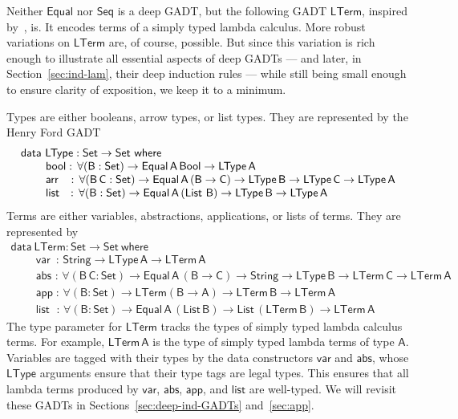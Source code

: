 \documentclass[9pt]{entcs}
\begin{document}
Neither $\mathsf{Equal}$ nor $\mathsf{Seq}$ is a deep GADT, but the
following GADT $\mathsf{LTerm}$, inspired by~\cite{cis194}, is.  It
encodes terms of a simply typed lambda calculus. More robust
variations on $\mathsf{LTerm}$ are, of course, possible. But since
this variation is rich enough to illustrate all essential aspects of
deep GADTs --- and later, in Section~\ref{sec:ind-lam}, their deep
induction rules --- while still being small enough to ensure clarity
of exposition, we keep it to a minimum.

Types are either booleans, arrow types, or list types. They are
represented by the Henry Ford GADT
\begin{equation}\label{eq:eq_ltype}
\begin{array}{l}
\mathsf{data\ LType : Set \to Set\ where}\\
\mathsf{\;\;\;\;\;\;\;\;bool :\, \forall (B : Set) \to Equal\,A\,Bool
  \to LType\,A}\\ 
\mathsf{\;\;\;\;\;\;\;\;arr\;\;\; :\, \forall (B\,C : Set) \to
  Equal\,A\,(B \to C) \to LType\,B \to LType\,C \to LType\,A}\\ 
  \mathsf{\;\;\;\;\;\;\;\;list\,\;\; :\, \forall (B : Set) \to
    Equal\,A\,(\mathsf{List}\,\,B) \to LType\,B \to LType\,A} 
\end{array}
\end{equation}
Terms are either variables, abstractions, applications, or lists of
terms. They are represented by
\begin{equation}\label{eq:eq_lterm}
\begin{array}{l}
\mathsf{data\ LTerm : Set \to Set\ where}\\
\mathsf{\;\;\;\;\;\;\;\;var\,\,\,:\, String \to LType\,A \to
  LTerm\,A} \\  
\mathsf{\;\;\;\;\;\;\;\;abs\,\, :\, \forall (B\,C : Set) \to
  Equal\,A\,(B \to C) \to String \to LType\,B \to LTerm\,C \to
  LTerm\,A}\\ 
  \mathsf{\;\;\;\;\;\;\;\;app\; :\, \forall (B : Set) \to
    LTerm (B \to A) \to LTerm\,B \to LTerm\,A} \\ 
  \mathsf{\;\;\;\;\;\;\;\;list\;\,\, :\, \forall (B : Set) \to
    Equal\,A\,(List\,B) \to List\,(LTerm\,B) \to LTerm\,A} 
\end{array}
\end{equation}
The type parameter for $\mathsf{LTerm}$ tracks the types of simply
typed lambda calculus terms. For example, $\mathsf{LTerm\,A}$ is the
type of simply typed lambda terms of type $\mathsf{A}$. Variables are
tagged with their types by the data constructors $\mathsf{var}$ and
$\mathsf{abs}$, whose $\mathsf{LType}$ arguments ensure that their
type tags are legal types. This ensures that all lambda terms
produced by $\mathsf{var}$, $\mathsf{abs}$, $\mathsf{app}$, and
$\mathsf{list}$ are well-typed.  We will revisit these GADTs in
Sections~\ref{sec:deep-ind-GADTs} and~\ref{sec:app}.
\end{document}
